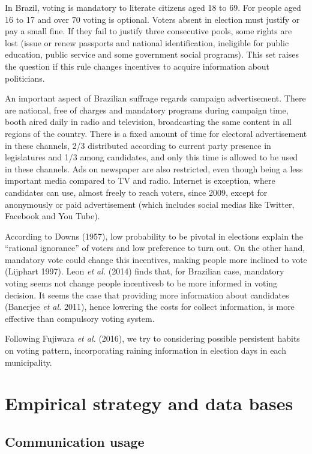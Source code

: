 \documentclass[12pt,]{article}
\begin{document}
In Brazil, voting is mandatory to literate citizens aged 18 to 69. For
people aged 16 to 17 and over 70 voting is optional. Voters absent in
election must justify or pay a small fine. If they fail to justify three
consecutive pools, some rights are lost (issue or renew passports and
national identification, ineligible for public education, public service
and some government social programs). This set raises the question if
this rule changes incentives to acquire information about politicians.

An important aspect of Brazilian suffrage regards campaign
advertisement. There are national, free of charges and mandatory
programs during campaign time, booth aired daily in radio and
television, broadcasting the same content in all regions of the country.
There is a fixed amount of time for electoral advertisement in these
channels, 2/3 distributed according to current party presence in
legislatures and 1/3 among candidates, and only this time is allowed to
be used in these channels. Ads on newspaper are also restricted, even
though being a less important media compared to TV and radio. Internet
is exception, where candidates can use, almost freely to reach voters,
since 2009, except for anonymously or paid advertisement (which includes
social medias like Twitter, Facebook and You Tube).

According to Downs (1957), low probability to be pivotal in elections
explain the ``rational ignorance'' of voters and low preference to turn
out. On the other hand, mandatory vote could change this incentives,
making people more inclined to vote (Lijphart 1997). Leon \emph{et al.}
(2014) finds that, for Brazilian case, mandatory voting seems not change
people incentivesb to be more informed in voting decision. It seems the
case that providing more information about candidates (Banerjee \emph{et
al.} 2011), hence lowering the costs for collect information, is more
effective than compulsory voting system.

Following Fujiwara \emph{et al.} (2016), we try to considering possible
persistent habits on voting pattern, incorporating raining information
in election days in each municipality.

\hypertarget{empirical-strategy-and-data-bases}{%
\section{Empirical strategy and data
bases}\label{empirical-strategy-and-data-bases}}

\hypertarget{communication-usage}{%
\subsection{Communication usage}\label{communication-usage}}
\end{document}
